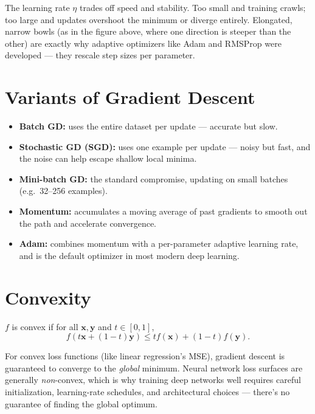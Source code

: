 
\begin{keyidea}
The learning rate $\eta$ trades off speed and stability. Too small and
training crawls; too large and updates overshoot the minimum or diverge
entirely. Elongated, narrow bowls (as in the figure above, where one
direction is steeper than the other) are exactly why adaptive optimizers
like Adam and RMSProp were developed — they rescale step sizes per
parameter.
\end{keyidea}

\section{Variants of Gradient Descent}

\begin{itemize}[leftmargin=*]
  \item \textbf{Batch GD:} uses the entire dataset per update — accurate but slow.
  \item \textbf{Stochastic GD (SGD):} uses one example per update — noisy but fast, and the noise can help escape shallow local minima.
  \item \textbf{Mini-batch GD:} the standard compromise, updating on small batches (e.g.\ 32–256 examples).
  \item \textbf{Momentum:} accumulates a moving average of past gradients to smooth out the path and accelerate convergence.
  \item \textbf{Adam:} combines momentum with a per-parameter adaptive learning rate, and is the default optimizer in most modern deep learning.
\end{itemize}

\section{Convexity}

\begin{definition}
$f$ is convex if for all $\mathbf{x}, \mathbf{y}$ and $t \in [0,1]$,
\[
  f(t\mathbf{x} + (1-t)\mathbf{y}) \le t f(\mathbf{x}) + (1-t) f(\mathbf{y}).
\]
\end{definition}

For convex loss functions (like linear regression's MSE), gradient descent
is guaranteed to converge to the \emph{global} minimum. Neural network loss
surfaces are generally \emph{non}-convex, which is why training deep
networks well requires careful initialization, learning-rate schedules, and
architectural choices — there's no guarantee of finding the global optimum.
